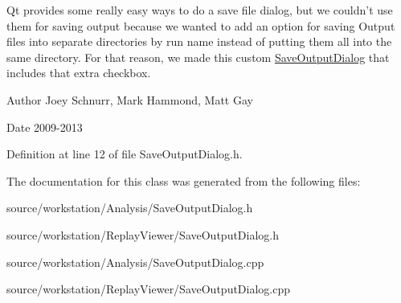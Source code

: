 Qt provides some really easy ways to do a save file dialog, but we couldn't use them for saving output because we wanted to add an option for saving Output files into separate directories by run name instead of putting them all into the same directory. For that reason, we made this custom \hyperlink{class_save_output_dialog}{Save\-Output\-Dialog} that includes that extra checkbox. \begin{DoxyAuthor}{Author}
Joey Schnurr, Mark Hammond, Matt Gay 
\end{DoxyAuthor}
\begin{DoxyDate}{Date}
2009-\/2013 
\end{DoxyDate}


Definition at line 12 of file Save\-Output\-Dialog.\-h.



The documentation for this class was generated from the following files\-:\begin{DoxyCompactItemize}
\item 
source/workstation/\-Analysis/Save\-Output\-Dialog.\-h\item 
source/workstation/\-Replay\-Viewer/Save\-Output\-Dialog.\-h\item 
source/workstation/\-Analysis/Save\-Output\-Dialog.\-cpp\item 
source/workstation/\-Replay\-Viewer/Save\-Output\-Dialog.\-cpp\end{DoxyCompactItemize}
